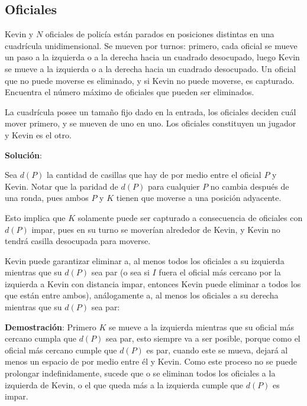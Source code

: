 \documentclass[14pt]{extarticle}
\begin{document}
\subsection*{Oficiales}

\begin{tcolorbox}[colback=blue!5!white,colframe=blue!75!black, title = Oficiales]
    Kevin y $N$ oficiales de policía están parados en posiciones distintas en una cuadrícula unidimensional. Se mueven por turnos: primero, cada oficial se mueve un paso a la izquierda o a la derecha hacia un cuadrado desocupado, luego Kevin se mueve a la izquierda o a la derecha hacia un cuadrado desocupado. Un oficial que no puede moverse es eliminado, y si Kevin no puede moverse, es capturado. Encuentra el número máximo de oficiales que pueden ser eliminados. 

    La cuadrícula posee un tamaño fijo dado en la entrada, los oficiales deciden cuál mover primero, y se mueven de uno en uno. Los oficiales constituyen un jugador y Kevin es el otro.

\end{tcolorbox}

\textbf{Solución}:

    Sea $d(P)$ la cantidad de casillas que hay de por medio entre el oficial $P$ y Kevin. Notar que la paridad de $d(P)$ para cualquier $P$ no cambia después de una ronda, pues ambos $P$ y $K$ tienen que moverse a una posición adyacente.

    Esto implica que $K$ solamente puede ser capturado a consecuencia de oficiales con $d(P)$ impar, pues en su turno se moverían alrededor de Kevin, y Kevin no tendrá casilla desocupada para moverse.
        
    Kevin puede garantizar eliminar a, al menos todos los oficiales a su izquierda mientras que su $d(P)$ sea par (o sea si $I$ fuera el oficial más cercano por la izquierda a Kevin con distancia impar, entonces Kevin puede eliminar a todos los que están entre ambos), análogamente a, al menos los oficiales a su derecha mientras que su $d(P)$ sea par:
    
    \textbf{Demostración}: Primero $K$ se mueve a la izquierda mientras que su oficial más cercano cumpla que $d(P)$ sea par, esto siempre va a ser posible, porque como el oficial más cercano cumple que $d(P)$ es par, cuando este se mueva, dejará al menos un espacio de por medio entre él y Kevin. Como este proceso no se puede prolongar indefinidamente, sucede que o se eliminan todos los oficiales a la izquierda de Kevin, o el que queda más a la izquierda cumple que $d(P)$ es impar.
    
\end{document}
